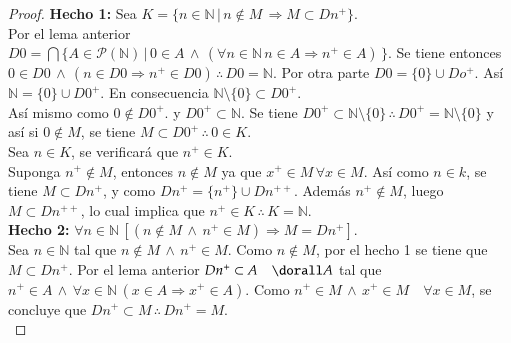 \begin{proof}
    \textbf{Hecho 1:} Sea $K=\{ n \in \mathbb{N} \, | \, n \notin M \,
    \Rightarrow M \subset Dn^+\}$.\\
    Por el lema anterior $D0 = \bigcap \{A \in
        \mathcal{P}(\mathbb{N}) \, | \, 0 \in A  \, \land \, (\forall n \in
    \mathbb{N} \, n \in A \Rightarrow n^+ \in A)\,\}$. Se tiene entonces $0
    \in D0 \, \land \, (n \in D0 \Rightarrow n^+ \in D0) \, \therefore \, D0
    = \mathbb{N}$. Por otra parte $D0 = \{0\} \cup Do^+$. Así $\mathbb{N} =
    \{0\} \cup D0^+$. En consecuencia $\mathbb{N}\setminus \{0\} \subset
    D0^+$. \\
    Así mismo como $0 \notin D0^+$. y $D0^+ \subset \mathbb{N}$. Se tiene
    $D0^+ \subset \mathbb{N} \setminus \{ 0\}\, \therefore \, D0^+ =
    \mathbb{N} \setminus \{0\}$ y así si $0 \notin M$, se tiene $M \subset
    D0^+\, \therefore\, 0 \in K$. \\
    Sea $n \in K$, se verificará que $n^+ \in K$.\\
    Suponga $n^+ \notin M$, entonces $n \notin M$ ya que $x^+ \in M\,
    \forall x \in M$. Así como $n \in k$, se tiene $M \subset Dn^+$, y como
    $Dn^+ = \{n^+\} \cup Dn^{++}$. Además $n^+ \notin M$, luego $M \subset
    Dn^{++}$, lo cual implica que $n^+\in K\, \therefore \, K
    =\mathbb{N}$.\\
    \textbf{Hecho 2:} $\forall n \in \mathbb{N} \, [(n \notin M \, \land \,
    n^+ \in M)\Rightarrow M=Dn^+]$.\\
    Sea $n \in \mathbb{N}$ tal que $n\notin M \, \land \, n^+ \in M$. Como $n
    \notin M$, por el hecho 1 se tiene que $M \subset Dn^+$. Por el lema
    anterior $Dn^+ \subset A\quad \dorall A$ tal que $ n^+ \in A \, \land \,
    \forall x \in \mathbb{N} \, (x \in A \Rightarrow x^+ \in A )$. Como
    $n^+ \in M \, \land \, x^+ \in M \quad \forall x \in M$, se concluye que
    $Dn^+ \subset M \, \therefore \, Dn^+ = M$. \\


\end{proof}
